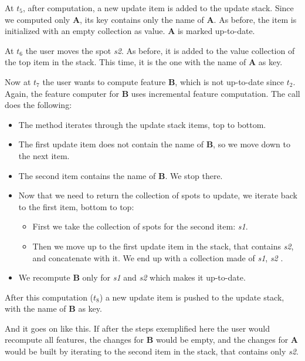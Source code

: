 At $t_5$, after computation, a new update item is added to the update stack. Since we computed only \textbf{A}, its key contains only the name of \textbf{A}. 
As before, the item is initialized with an empty collection as value. 
\textbf{A} is marked up-to-date.

At $t_6$ the user moves the spot \textit{s2}. 
As before, it is added to the value collection of the top item in the stack. 
This time, it is the one with the name of \textbf{A} as key.

Now at $t_7$ the user wants to compute feature \textbf{B}, which is not up-to-date since $t_2$. 
Again, the feature computer for \textbf{B} uses incremental feature computation. 
The call does the following:

\begin{itemize}

    \item The method iterates through the update stack items, top to bottom.
    
    \item The first update item does not contain the name of \textbf{B}, so we move down to the next item.
    
    \item The second item contains the name of \textbf{B}. We stop there.
    
    \item Now that we need to return the collection of spots to update, we iterate back to the first item, bottom to top:
    
    \begin{itemize}
        \item First we take the collection of spots for the second item: \textit{s1}.
        \item  Then we move up to the first update item in the stack, that contains \textit{s2}, and concatenate with it. 
        We end up with a collection made of { \textit{s1}, \textit{s2} }.
    \end{itemize}

    \item We recompute \textbf{B} only for \textit{s1} and \textit{s2} which makes it up-to-date.
\end{itemize}
\noindent After this computation ($t_8$) a new update item is pushed to the update stack, with the name of \textbf{B} as key.

And it goes on like this. 
If after the steps exemplified here the user would recompute all features, the changes for \textbf{B} would be empty, and the changes for \textbf{A} would be built by iterating to the second item in the stack, that contains only \textit{s2}.

